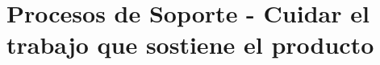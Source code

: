 \clearpage
\section{Procesos de Soporte - Cuidar el trabajo que sostiene el producto}\label{sec:spmp-12}





